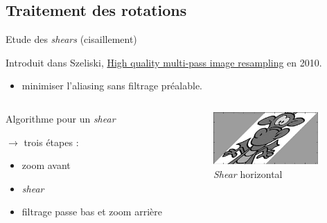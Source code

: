 \documentclass[c,12pt]{beamer}
\newcommand{\ra}[0]{\rightarrow}
\begin{document}

\subsection{Traitement des rotations}

\begin{frame}{Etude des \emph{shears} (cisaillement)}

Introduit dans Szeliski, \underline{High quality multi-pass image resampling} en 2010. %

\begin{itemize}
\item minimiser l'aliasing sans filtrage préalable.
\end{itemize}

\begin{columns}
\begin{column}{5cm}

\begin{block}{Algorithme pour un \emph{shear}}

$\ra$ trois étapes :

\begin{itemize}
\item zoom avant
\item \emph{shear}
\item filtrage passe bas et zoom arrière
\end{itemize}

\end{block}
  
 \end{column}

\begin{column}{5cm}

\begin{figure}
\centering
\includegraphics[width=4cm]{dragonshear.jpg}
\caption{\emph{Shear} horizontal}
\end{figure}

\end{column}
\end{columns}
\end{frame}
\end{document}
